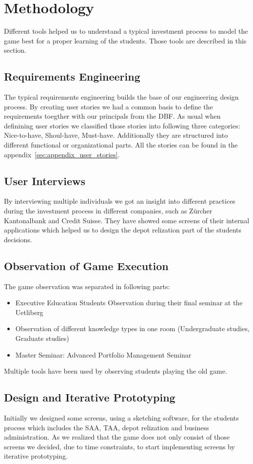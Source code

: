 \section{Methodology}
Different tools helped us to understand a typical investment process to model the game best for a proper learning of the students. Those tools are described in this section.

\subsection{Requirements Engineering}
The typical requirements engineering builds the base of our engineering design process. By creating user stories we had a common basis to define the requirements toegther with our principals from the DBF. As usual when definining user stories we classified those stories into following three categories: Nice-to-have, Shoul-have, Must-have. Additionally they are structured into different functional or organizational parts. All the stories can be found in the appendix~\ref{sec:appendix_user_stories}.

\subsection{User Interviews}
By interviewing multiple individuals we got an insight into different practices during the investment process in different companies, such as Zürcher Kantonalbank and Credit Suisse. They have showed some screens of their internal applications which helped us to design the depot relization part of the students decisions.

\subsection{Observation of Game Execution}
The game observation was separated in following parts:
\begin{itemize}
  \item Executive Education Students Observation during their final seminar at the Uetliberg
  \item Observation of different knowledge types in one room (Undergraduate studies, Graduate studies)
  \item Master Seminar: Advanced Portfolio Management Seminar
\end{itemize}

Multiple tools have been used by observing students playing the old game. %

\subsection{Design and Iterative Prototyping}
Initially we designed some screens, using a sketching software, for the students process which includes the SAA, TAA, depot relization and business administration. As we realized that the game does not only consist of those screens we decided, due to time constraints, to start implementing screens by iterative prototyping.
